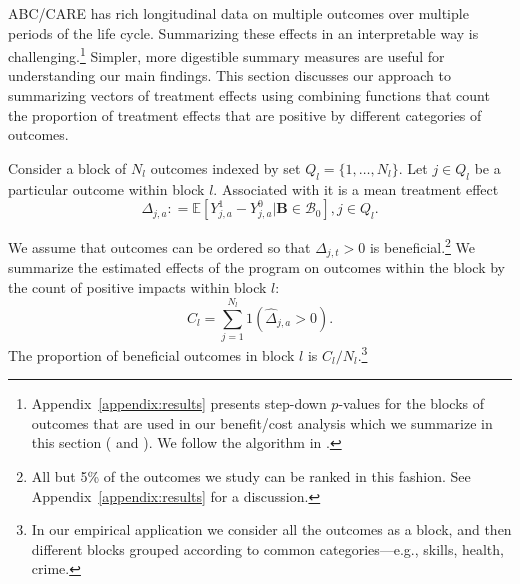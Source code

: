 ABC/CARE has rich longitudinal data on multiple outcomes over multiple periods of the life cycle. Summarizing these effects in an interpretable way is challenging.\footnote{Appendix~\ref{appendix:results} presents step-down $p$-values for the blocks of outcomes that are used in our benefit/cost analysis which we summarize in this section (\citealp{Lehman_Romano_2005_AnnStat} and \citealp{Romano_Shaikh_2006_AnnStat}). We follow the algorithm in \citet{Romano_Wolf_2016_pval_SaPL}.} Simpler, more digestible summary measures are useful for understanding our main findings. This section discusses our approach to summarizing vectors of treatment effects using combining functions that count the proportion of treatment effects that are positive by different categories of outcomes.

Consider a block of $N_l$ outcomes indexed by set $Q_l = \{1,\dots,N_l\}$. Let $j \in Q_l$ be a particular outcome within block $l$. Associated with it is a mean treatment effect
\begin{equation}
\Delta_{j,a} : = \mathbb{E} \left[ Y^1_{j,a} - Y^0_{j,a} | \bm{B} \in \mathcal{B}_0 \right], j \in Q_l.
\end{equation}

We assume that outcomes can be ordered so that $\Delta_{j,t} >0$ is beneficial.\footnote{All but 5\% of the outcomes we study can be ranked in this fashion. See Appendix~\ref{appendix:results} for a discussion.} We summarize the estimated effects of the program on outcomes within the block by the count of positive impacts within block $l$:
\begin{equation}
C_l = \sum^{N_l}_{j=1} 1 (\hat{\Delta}_{j,a} >0).
\end{equation}
The proportion of beneficial outcomes in block $l$ is $C_l / N_l$.\footnote{In our empirical application we consider all the outcomes as a block, and then different blocks grouped according to common categories---e.g., skills, health, crime.}

